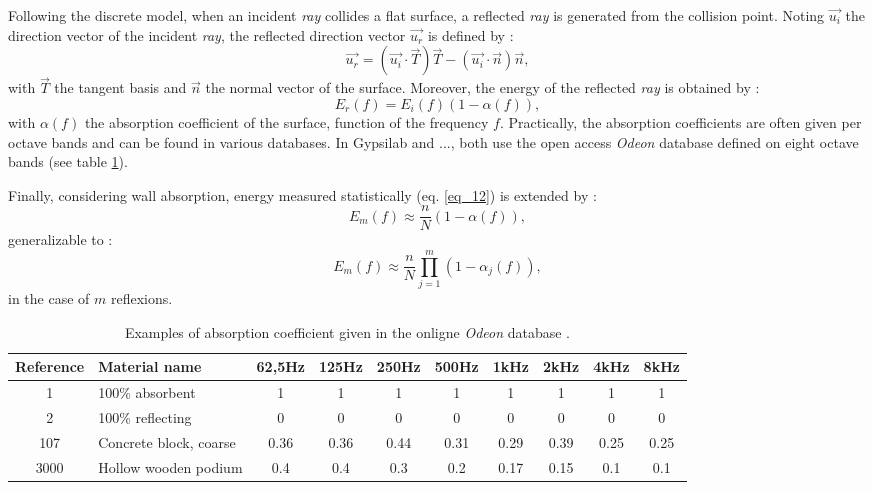 \documentclass[AMA,STIX1COL]{WileyNJD-v2}
\begin{document}
Following the discrete model, when an incident \textit{ray} collides a flat surface, a reflected \textit{ray} is generated from the collision point. Noting $\overrightarrow{u_i}$ the direction vector of the incident  \textit{ray}, the reflected direction vector $\overrightarrow{u_r}$ is defined by :
\begin{equation}
\label{eq_15}
\overrightarrow{u_r} = (\overrightarrow{u_i} \cdot \overrightarrow{T})\overrightarrow{T} - (\overrightarrow{u_i} \cdot \overrightarrow{n})\overrightarrow{n},
\end{equation}
with $\overrightarrow{T}$ the tangent basis and $\overrightarrow{n}$ the normal vector of the surface. Moreover, the energy of the reflected \textit{ray} is obtained by :
\begin{equation}
E_r(f) = E_i(f)(1 - \alpha(f)),
\end{equation}
with $\alpha(f)$  the absorption coefficient of the surface, function of the frequency $f$. Practically, the absorption coefficients are often given per octave bands and can be found in various databases. In Gypsilab and ..., both use the open access \textit{Odeon} database \cite{odeon} defined on eight octave bands (see table \ref{tab_coeff_abs}). 

Finally, considering wall absorption, energy measured statistically (eq. \ref{eq_12}) is extended by :
\begin{equation}
E_m(f) \approx  \frac{n}{N}(1 - \alpha(f)),
\end{equation}
generalizable to :
\begin{equation}
E_m(f) \approx  \frac{n}{N}\prod_{j=1}^{m}(1 - \alpha_j(f)),
\label{eq_18}
\end{equation}
in the case of $m$ reflexions.

\begin{table}
\centering
	\begin{tabular}{| c | m{2.5cm} | *{8}{c|}}
		\hline
		Reference & Material name & 62,5Hz & 125Hz & 250Hz & 500Hz & 1kHz & 2kHz & 4kHz & 8kHz \\
		  \hline
		  \hline
		   1 & 100\% absorbent & 1 & 1 & 1 & 1 & 1 & 1 & 1 & 1 \\
		   \hline
		2 & 100\% reflecting & 0 & 0 & 0 & 0 & 0 & 0 & 0 & 0 \\
		   \hline
		107 & Concrete block, coarse\footnotemark & 0.36 & 0.36 & 0.44 & 0.31 & 0.29 & 0.39 & 0.25 & 0.25 \\
		   \hline
		3000 & Hollow wooden podium\footnotemark & 0.4 & 0.4 & 0.3 & 0.2 & 0.17 & 0.15 & 0.1 & 0.1 \\
	     \hline
	 \end{tabular}
	\caption{Examples of absorption coefficient given in the onligne \textit{Odeon} database \cite{odeon}.}
	 \label{tab_coeff_abs}
\end{table}
\addtocounter{footnote}{-1}
\addtocounter{footnote}{1}
\end{document}
